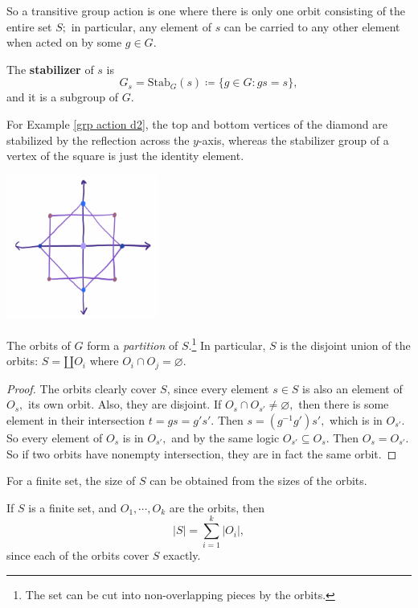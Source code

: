 So a transitive group action is one where there is only one orbit consisting of the entire set $S;$ in particular, any element of $s$ can be carried to any other element when acted on by some $g \in G.$

\begin{definition}
The \textbf{stabilizer} of $s$ is 
\[
G_s = \text{Stab}_G(s) \coloneqq \{g \in G: gs = s\},
\]
and it is a subgroup of $G.$
\end{definition}

For Example \ref{grp action d2}, the top and bottom vertices of the diamond are stabilized by the reflection across the $y$-axis, whereas the stabilizer group of a vertex of the square is just the identity element.

\begin{center}
    \includegraphics[width=5cm]{Lecture Files and Images/lec17-orbitsofS.png}
\end{center}

\begin{proposition}
The orbits of $G$ form a \emph{partition} of $S.$\footnote{The set can be cut into non-overlapping pieces by the orbits.} In particular, $S$ is the disjoint union of the orbits: $S = \amalg O_i$ where $O_i \cap O_j = \varnothing.$ 
\end{proposition}
\begin{proof}
The orbits clearly cover $S$, since every element $s \in S$ is also an element of $O_s,$ its own orbit. Also, they are disjoint. If $O_s \cap O_{s'} \neq \varnothing,$ then there is some element in their intersection $t = gs = g's'$. Then $s = (g^{-1}g')s',$ which is in $O_{s'}$. So every element of $O_s$ is in $O_{s'},$ and by the same logic $O_{s'} \subseteq O_s.$ Then $O_s = O_{s'}$. So if two orbits have nonempty intersection, they are in fact the same orbit.
\end{proof}

For a finite set, the size of $S$ can be obtained from the sizes of the orbits. 

\begin{corollary}
If $S$ is a finite set, and $O_1, \cdots, O_k$ are the orbits, then 
\[
|S| = \sum_{i = 1}^k |O_i|,
\]
since each of the orbits cover $S$ exactly.
\end{corollary}

